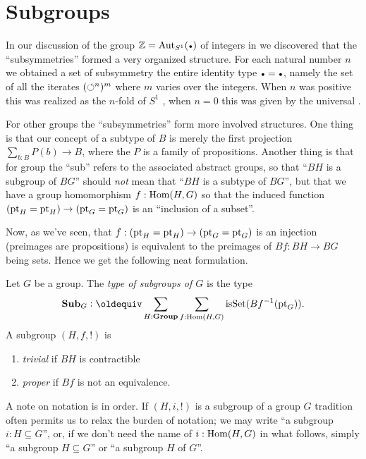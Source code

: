 \label{ch:subgroups}

\section{Subgroups}
\label{sec:subgroups}
In our discussion of the group $\ZZ=\aut_{S^1}(\base)$ of integers in we discovered that the ``subsymmetries'' formed a very organized structure.  For each natural number $n$ we obtained a set of subsymmetry the entire identity type $\base=\base$, namely the set of all the iterates $(\circlearrowleft^{n})^m$ where $m$ varies over the integers.  When $n$ was positive this was realized as the $n$-fold \covering of $S^1$ , when $n=0$ this was given by the universal \covering.  

For other groups the ``subsymmetries'' form more involved structures.  One thing is that our concept of a subtype of $B$ is merely the first projection $\sum_{b:B}P(b)\to B$, where the $P$ is a family of propositions.  Another thing is that for group the ``sub'' refers to the associated abstract groups, so that ``$BH$ is a subgroup of $BG$'' should \emph{not} mean that ``$BH$ is a subtype of $BG$'', but that we have a group homomorphism $f:\mathrm{Hom}(H,G)$ so that the induced function $(\mathrm{pt}_H=\mathrm{pt}_H)\to(\mathrm{pt}_G=\mathrm{pt}_G)$ is an ``inclusion of a subset''. 

Now, as we've seen, that   $f:(\mathrm{pt}_H=\mathrm{pt}_H)\to(\mathrm{pt}_G=\mathrm{pt}_G)$ is an injection (preimages are propositions) is equivalent to the preimages of $Bf:BH\to BG$ being sets.  Hence we get the following neat formulation.
    \begin{definition}
      \label{def:subgroup}
      Let $G$ be a group.  
      The \emph{type of subgroups of $G$} is the type
      $$\typesubgroup_G\defequi\sum_{H:\typegroup}\sum_{f:\Hom(H,G)}\isset(Bf^{-1}(\pt_G)).$$
       A subgroup $(H,f,!)$ is
      \begin{enumerate}
      \item \emph{trivial} if $BH$ is contractible
      \item \emph{proper} if $Bf$ is not an equivalence.
      \end{enumerate}
    \end{definition}
    \begin{remark}
      \label{rem:notationsubgroup}
      A note on notation is in order.  
If $(H,i,!)$ is a subgroup of a group $G$ tradition often permits us to relax the burden of notation; we may write ``a subgroup $i:H\subseteq G$'', or, if we don't need the name of $i:\mathrm{Hom}(H,G)$ in what follows, simply ``a subgroup $H\subseteq G$'' or ``a subgroup $H$ of $G$''.
    \end{remark}

